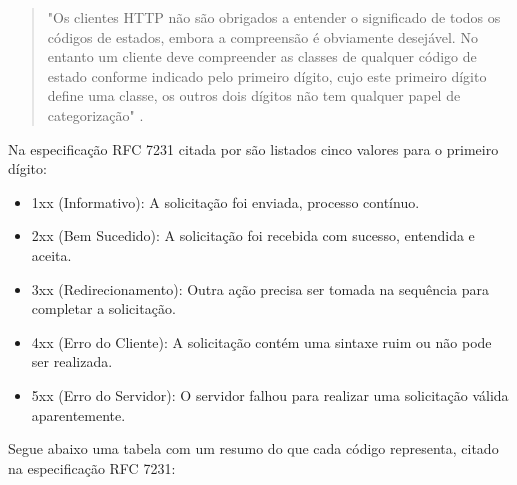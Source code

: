 \begin{quote}
"Os clientes HTTP não são obrigados a entender o significado de todos os códigos de estados, embora a compreensão é obviamente desejável. No entanto um cliente deve compreender as classes de qualquer código de estado conforme indicado pelo primeiro dígito, cujo este primeiro dígito define uma classe, os outros dois dígitos não tem qualquer papel de categorização" \cite{rfc7231}.
\end{quote}

Na especificação RFC 7231 citada por \cite{rfc7231} são listados cinco valores para o primeiro dígito: 
\begin{itemize}
\item 1xx (Informativo): A solicitação foi enviada, processo contínuo.
\item 2xx (Bem Sucedido): A solicitação foi recebida com sucesso, entendida e aceita.
\item 3xx (Redirecionamento): Outra ação precisa ser tomada na sequência para completar a solicitação.
\item 4xx (Erro do Cliente): A solicitação contém uma sintaxe ruim ou não pode ser realizada.
\item 5xx (Erro do Servidor): O servidor falhou para realizar uma solicitação válida aparentemente.
\end{itemize}

Segue abaixo uma tabela com um resumo do que cada código representa, citado na especificação RFC 7231:


